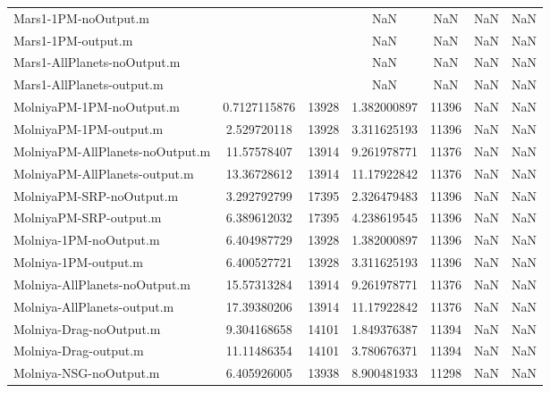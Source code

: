 \begin{table}[htbp!]
\begin{tabular}{lcccccc}
         Mars1-1PM-noOutput.m &  &  & NaN & NaN & NaN & NaN \\
         Mars1-1PM-output.m &  &  & NaN & NaN & NaN & NaN \\
         Mars1-AllPlanets-noOutput.m &  &  & NaN & NaN & NaN & NaN \\
         Mars1-AllPlanets-output.m &  &  & NaN & NaN & NaN & NaN \\
         MolniyaPM-1PM-noOutput.m & 0.7127115876 & 13928 & 1.382000897 & 11396 & NaN & NaN \\
         MolniyaPM-1PM-output.m & 2.529720118 & 13928 & 3.311625193 & 11396 & NaN & NaN \\
         MolniyaPM-AllPlanets-noOutput.m & 11.57578407 & 13914 & 9.261978771 & 11376 & NaN & NaN \\
         MolniyaPM-AllPlanets-output.m & 13.36728612 & 13914 & 11.17922842 & 11376 & NaN & NaN \\
         MolniyaPM-SRP-noOutput.m & 3.292792799 & 17395 & 2.326479483 & 11396 & NaN & NaN \\
         MolniyaPM-SRP-output.m & 6.389612032 & 17395 & 4.238619545 & 11396 & NaN & NaN \\
         Molniya-1PM-noOutput.m & 6.404987729 & 13928 & 1.382000897 & 11396 & NaN & NaN \\
         Molniya-1PM-output.m & 6.400527721 & 13928 & 3.311625193 & 11396 & NaN & NaN \\
         Molniya-AllPlanets-noOutput.m & 15.57313284 & 13914 & 9.261978771 & 11376 & NaN & NaN \\
         Molniya-AllPlanets-output.m & 17.39380206 & 13914 & 11.17922842 & 11376 & NaN & NaN \\
         Molniya-Drag-noOutput.m & 9.304168658 & 14101 & 1.849376387 & 11394 & NaN & NaN \\
         Molniya-Drag-output.m & 11.11486354 & 14101 & 3.780676371 & 11394 & NaN & NaN \\
         Molniya-NSG-noOutput.m & 6.405926005 & 13938 & 8.900481933 & 11298 & NaN & NaN \\

\end{tabular}
\end{table}
